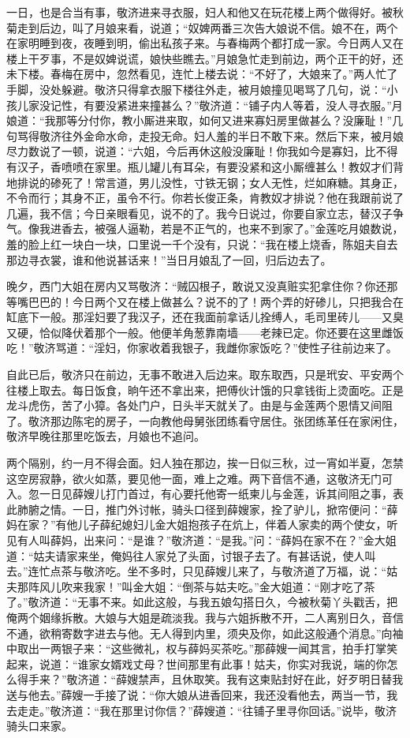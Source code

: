 一日，也是合当有事，敬济进来寻衣服，妇人和他又在玩花楼上两个做得好。被秋菊走到后边，叫了月娘来看，说道；“奴婢两番三次告大娘说不信。娘不在，两个在家明睡到夜，夜睡到明，偷出私孩子来。与春梅两个都打成一家。今日两人又在楼上干歹事，不是奴婢说谎，娘快些瞧去。”月娘急忙走到前边，两个正干的好，还未下楼。春梅在房中，忽然看见，连忙上楼去说：“不好了，大娘来了。”两人忙了手脚，没处躲避。敬济只得拿衣服下楼往外走，被月娘撞见喝骂了几句，说：“小孩儿家没记性，有要没紧进来撞甚么？”敬济道：“铺子内人等着，没人寻衣服。”月娘道：“我那等分付你，教小厮进来取，如何又进来寡妇房里做甚么？没廉耻！”几句骂得敬济往外金命水命，走投无命。妇人羞的半日不敢下来。然后下来，被月娘尽力数说了一顿，说道：“六姐，今后再休这般没廉耻！你我如今是寡妇，比不得有汉子，香喷喷在家里。瓶儿罐儿有耳朵，有要没紧和这小厮缠甚么！教奴才们背地排说的碜死了！常言道，男儿没性，寸铁无钢；女人无性，烂如麻糖。其身正，不令而行；其身不正，虽令不行。你若长俊正条，肯教奴才排说？他在我跟前说了几遍，我不信；今日亲眼看见，说不的了。我今日说过，你要自家立志，替汉子争气。像我进香去，被强人逼勒，若是不正气的，也来不到家了。”金莲吃月娘数说，羞的脸上红一块白一块，口里说一千个没有，只说：“我在楼上烧香，陈姐夫自去那边寻衣裳，谁和他说甚话来！”当日月娘乱了一回，归后边去了。

晚夕，西门大姐在房内又骂敬济：“贼囚根子，敢说又没真赃实犯拿住你？你还那等嘴巴巴的！今日两个又在楼上做甚么？说不的了！两个弄的好碜儿，只把我合在缸底下一般。那淫妇要了我汉子，还在我面前拿话儿拴缚人，毛司里砖儿——又臭又硬，恰似降伏着那个一般。他便羊角葱靠南墙——老辣已定。你还要在这里雌饭吃！”敬济骂道：“淫妇，你家收着我银子，我雌你家饭吃？”使性子往前边来了。

自此已后，敬济只在前边，无事不敢进入后边来。取东取西，只是玳安、平安两个往楼上取去。每日饭食，晌午还不拿出来，把傅伙计饿的只拿钱街上烫面吃。正是龙斗虎伤，苦了小獐。各处门户，日头半天就关了。由是与金莲两个恩情又间阻了。敬济那边陈宅的房子，一向教他母舅张团练看守居住。张团练革任在家闲住，敬济早晚往那里吃饭去，月娘也不追问。

两个隔别，约一月不得会面。妇人独在那边，挨一日似三秋，过一宵如半夏，怎禁这空房寂静，欲火如蒸，要见他一面，难上之难。两下音信不通，这敬济无门可入。忽一日见薛嫂儿打门首过，有心要托他寄一纸柬儿与金莲，诉其间阻之事，表此肺腑之情。一日，推门外讨帐，骑头口径到薛嫂家，拴了驴儿，掀帘便问：“薛妈在家？”有他儿子薛纪媳妇儿金大姐抱孩子在炕上，伴着人家卖的两个使女，听见有人叫薛妈，出来问：“是谁？”敬济道：“是我。”问：“薛妈在家不在？”金大姐道：“姑夫请家来坐，俺妈往人家兑了头面，讨银子去了。有甚话说，使人叫去。”连忙点茶与敬济吃。坐不多时，只见薛嫂儿来了，与敬济道了万福，说：“姑夫那阵风儿吹来我家！”叫金大姐：“倒茶与姑夫吃。”金大姐道：“刚才吃了茶了。”敬济道：“无事不来。如此这般，与我五娘勾搭日久，今被秋菊丫头戳舌，把俺两个姻缘拆散。大娘与大姐是疏淡我。我与六姐拆散不开，二人离别日久，音信不通，欲稍寄数字进去与他。无人得到内里，须央及你，如此这般通个消息。”向袖中取出一两银子来：“这些微礼，权与薛妈买茶吃。”那薛嫂一闻其言，拍手打掌笑起来，说道：“谁家女婿戏丈母？世间那里有此事！姑夫，你实对我说，端的你怎么得手来？”敬济道：“薛嫂禁声，且休取笑。我有这柬贴封好在此，好歹明日替我送与他去。”薛嫂一手接了说：“你大娘从进香回来，我还没看他去，两当一节，我去走走。”敬济道：“我在那里讨你信？”薛嫂道：“往铺子里寻你回话。”说毕，敬济骑头口来家。

